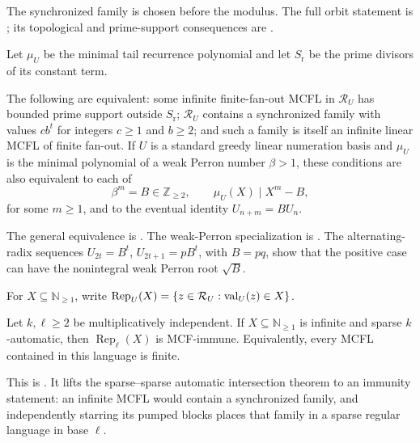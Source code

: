 The synchronized family is chosen before the modulus. The full orbit
statement is ; its topological
and prime-support consequences are
.

Let \(\mu_U\) be the minimal tail recurrence polynomial and let
\(S_{\mathrm r}\) be the prime divisors of its constant term.

\begin{maintheorem}
The following are equivalent: some infinite finite-fan-out MCFL in
\(\mathcal R_U\) has bounded prime support outside \(S_{\mathrm r}\);
\(\mathcal R_U\) contains a synchronized family with values \(cb^t\) for
integers \(c\ge1\) and \(b\ge2\); and such a family is itself an infinite
linear MCFL of finite fan-out. If \(U\) is a standard greedy linear
numeration basis and \(\mu_U\) is the minimal polynomial of a weak Perron
number \(\beta>1\), these conditions are also equivalent to each of
\[
  \beta^m=B\in\mathbb Z_{\ge2},\qquad
  \mu_U(X)\mid X^m-B,
\]
for some \(m\ge1\), and to the eventual identity
\(U_{n+m}=BU_n\).
\end{maintheorem}

The general equivalence is
. The weak-Perron
specialization is
.
The alternating-radix sequences
\(U_{2t}=B^t\), \(U_{2t+1}=pB^t\), with \(B=pq\), show that the positive
case can have the nonintegral weak Perron root \(\sqrt B\).

For \(X\subseteq\mathbb N_{\ge1}\), write
\(\operatorname{Rep}_U(X)=\{z\in\mathcal R_U:\operatorname{val}_U(z)\in X\}\).

\begin{maintheorem}
Let \(k,\ell\ge2\) be multiplicatively independent. If
\(X\subseteq\mathbb N_{\ge1}\) is infinite and sparse \(k\)-automatic, then
\(\operatorname{Rep}_\ell(X)\) is MCF-immune. Equivalently, every MCFL
contained in this language is finite.
\end{maintheorem}

This is . It lifts
the sparse--sparse automatic intersection theorem to an immunity statement:
an infinite MCFL would contain a synchronized family, and independently
starring its pumped blocks places that family in a sparse regular language
in base \(\ell\).

